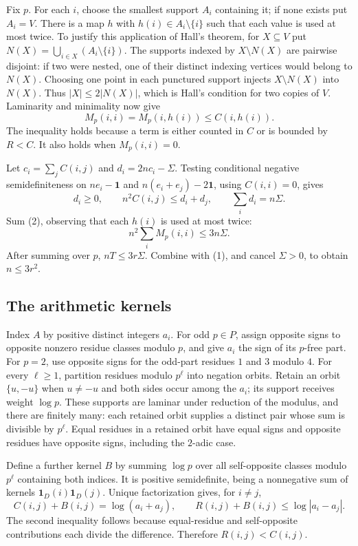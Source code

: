 Fix $p$. For each $i$, choose the smallest support $A_i$ containing it;
if none exists put $A_i=V$. There is a map $h$ with
$h(i)\in A_i\setminus\{i\}$ such that each value is used at most twice.
To justify this application of Hall's theorem, for $X\subseteq V$ put
$N(X)=\bigcup_{i\in X}(A_i\setminus\{i\})$. The supports indexed by
$X\setminus N(X)$ are pairwise disjoint: if two were nested, one of
their distinct indexing vertices would belong to $N(X)$. Choosing one
point in each punctured support injects $X\setminus N(X)$ into $N(X)$.
Thus $|X|\le2|N(X)|$, which is Hall's condition for two copies of $V$.
Laminarity and minimality now give
\[
 M_p(i,i)=M_p(i,h(i))\le C(i,h(i)).              \tag{2}
\]
The inequality holds because a term is either counted in $C$ or is
bounded by $R<C$. It also holds when $M_p(i,i)=0$.

Let $c_i=\sum_j C(i,j)$ and $d_i=2nc_i-\Sigma$. Testing conditional
negative semidefiniteness on $ne_i-\mathbf1$ and
$n(e_i+e_j)-2\mathbf1$, using $C(i,i)=0$, gives
\[
 d_i\ge0,\qquad n^2 C(i,j)\le d_i+d_j,\qquad
 \sum_i d_i=n\Sigma.
\]
Sum (2), observing that each $h(i)$ is used at most twice:
\[
 n^2\sum_iM_p(i,i)\le3n\Sigma.
\]
After summing over $p$, $nT\le3r\Sigma$. Combine with (1), and cancel
$\Sigma>0$, to obtain $n\le3r^2$.

\subsection*{The arithmetic kernels}
Index $A$ by positive distinct integers $a_i$. For odd $p\in P$, assign
opposite signs to opposite nonzero residue classes modulo $p$, and give
$a_i$ the sign of its $p$-free part. For $p=2$, use opposite signs for
the odd-part residues $1$ and $3$ modulo $4$.
For every $\ell\ge1$, partition residues modulo $p^\ell$ into negation
orbits. Retain an orbit $\{u,-u\}$ when $u\ne-u$ and both sides occur
among the $a_i$; its support receives weight $\log p$. These supports
are laminar under reduction of the modulus, and there are finitely many:
each retained orbit supplies a distinct pair whose sum is divisible by
$p^\ell$. Equal residues in a retained orbit have equal signs and opposite
residues have opposite signs, including the $2$-adic case.

Define a further kernel $B$ by summing $\log p$ over all self-opposite
classes modulo $p^\ell$ containing both indices. It is positive
semidefinite, being a nonnegative sum of kernels
$\mathbf1_D(i)\mathbf1_D(j)$. Unique factorization gives, for $i\ne j$,
\[
 C(i,j)+B(i,j)=\log(a_i+a_j),\qquad
 R(i,j)+B(i,j)\le\log|a_i-a_j|.                \tag{3}
\]
The second inequality follows because equal-residue and self-opposite
contributions each divide the difference. Therefore $R(i,j)<C(i,j)$.

